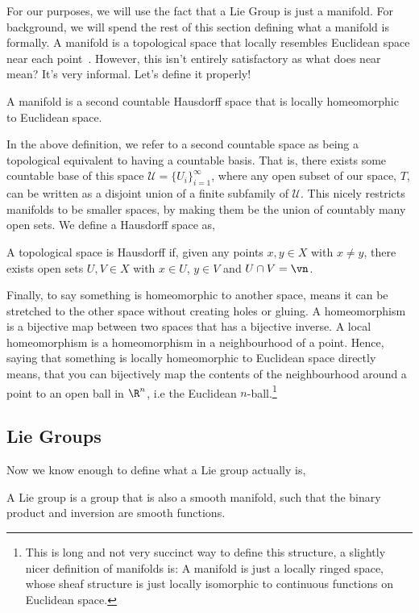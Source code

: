 \noindent
For our purposes, we will use the fact that a Lie Group is just a manifold. For background, we will spend the rest of this section defining what a manifold is formally. A manifold is a topological space that locally resembles Euclidean space near each point~\cite{wmwMan}. However, this isn't entirely satisfactory as what does near mean? It's very informal. Let's define it properly!
\begin{ndefi}[Manifold]
  A manifold is a second countable Hausdorff space that is locally homeomorphic to Euclidean space.
\end{ndefi}

\noindent
In the above definition, we refer to a second countable space as being a topological equivalent to having a countable basis. That is, there exists some countable base of this space $\mathcal{U} = \{U_i\}_{i=1}^\infty$, where any open subset of our space, $T$, can be written as a disjoint union of a finite subfamily of $\mathcal{U}$. This nicely restricts manifolds to be smaller spaces, by making them be the union of countably many open sets. We define a Hausdorff space as,
\begin{ndefi}[Hausdorff]
  A topological space is Hausdorff if, given any points $x, y \in X$ with $x \ne y$, there exists open sets $U, V \in X$ with $x \in U$, $y \in V$ and $U \cap V = \vn$.
\end{ndefi}

\noindent
Finally, to say something is homeomorphic to another space, means it can be stretched to the other space without creating holes or gluing. A homeomorphism is a bijective map between two spaces that has a bijective inverse. A local homeomorphism is a homeomorphism in a neighbourhood of a point. Hence, saying that something is locally homeomorphic to Euclidean space directly means, that you can bijectively map the contents of the neighbourhood around a point to an open ball in $\R^n$, i.e the Euclidean $n$-ball.\footnote{This is long and not very succinct way to define this structure, a slightly nicer definition of manifolds is: A manifold is just a locally ringed space, whose sheaf structure is just locally isomorphic to continuous functions on Euclidean space.}

\noindent
\subsection{Lie Groups}
Now we know enough to define what a Lie group actually is,
\begin{ndefi}
  A Lie group is a group that is also a smooth manifold, such that the binary product and inversion are smooth functions.
\end{ndefi}


